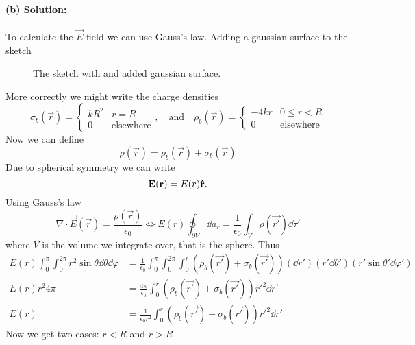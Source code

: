 \paragraph{(b) Solution:} To calculate the $\vec{E}$ field we can use Gauss's law. Adding a gaussian surface to the sketch
\begin{figure}[H]
    \centering
    
    \caption{The sketch with and added gaussian surface.}\label{fig:gauss}
\end{figure}
More correctly we might write the charge densities
\begin{equation}
    \sigma_b(\vec{r}) = \begin{cases}
        kR^2 & r = R\\
        0 & \text{elsewhere}
    \end{cases}, \quad \text{and}\quad
    \rho_b(\vec{r}) = \begin{cases}
        -4kr & 0 \leq r < R\\
        0 & \text{elsewhere}
    \end{cases}\label{eq:charges}
\end{equation}
Now we can define 
\begin{equation}
    \rho(\vec{r}) = \rho_b(\vec{r}) + \sigma_b(\vec{r})
\end{equation}
Due to spherical symmetry we can write 
\begin{equation}
    \mathbf{E}(\mathbf{r}) = E(r)\mathbf{\hat{r}}.
\end{equation}
Using Gauss's law
\begin{equation}
    \nabla \cdot \vec{E}(\vec{r}) = \frac{\rho(\vec{r})}{\epsilon_0} \iff E(r) \oint_{\partial V} \dd a_r = \frac{1}{\epsilon_0}\int_V \rho(\vec{r'})\dd \tau'
\end{equation}
where $V$ is the volume we integrate over, that is the sphere. Thus
\begin{align}
    E(r) \int_{0}^{\pi} \int_{0}^{2\pi} r^2 \sin\theta \dd \theta \dd\varphi &= \frac{1}{\epsilon_0}\int_{0}^{\pi} \int_{0}^{2\pi} \int_{0}^{r}(\rho_b(\vec{r'}) + \sigma_b(\vec{r'})) (\dd r') (r' \dd \theta') (r' \sin\theta' \dd \varphi')\\
    E(r)r^2 4\pi &= \frac{4\pi}{\epsilon_0} \int_{0}^{r}(\rho_b(\vec{r'}) + \sigma_b(\vec{r'}))r'^2 \dd r'\\
    E(r) &= \frac{1}{\epsilon_0 r^2}\int_{0}^{r} (\rho_b(\vec{r'}) + \sigma_b(\vec{r'}))r'^2 \dd r'
\end{align}
Now we get two cases: $r < R$ and $r > R$
